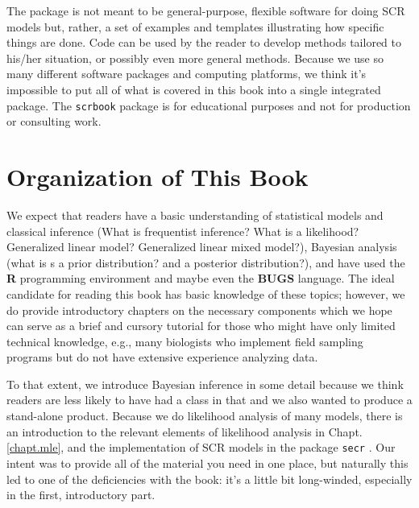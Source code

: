 The %
package is not meant to be general-purpose, %
flexible software for doing SCR models but, rather, a set of examples
and templates %
illustrating how specific things are done. Code can be used
by the reader to develop methods tailored to his/her situation, or
possibly even more general methods.  Because we use so many different
software packages and computing platforms, we think it's impossible to
put all of what is covered in this book into a single integrated
package.  The \mbox{\tt scrbook} package is for educational purposes
and not for production or consulting work.


\section*{Organization of This Book}

We expect that readers have a basic understanding of statistical
models and classical inference (What is frequentist inference? What is
a likelihood? Generalized linear model? Generalized linear mixed
model?), Bayesian analysis (what is s a prior distribution? and a
posterior distribution?), and have used the {\bf R} programming
environment and maybe even %
the \textbf{BUGS} language.  The ideal candidate for
reading this book has basic knowledge of these topics; however, we do
provide introductory chapters on the necessary components which we
hope can serve as a brief and cursory tutorial for those who might
have only limited technical knowledge, e.g., many biologists who
implement field sampling programs but do not have extensive experience
analyzing data.

To that extent, we introduce Bayesian inference in some detail because
we think readers are less likely to have had a class in that and we
also wanted to produce a stand-alone product.  Because we do
likelihood analysis of many models, there is an introduction to the
relevant elements of likelihood analysis in Chapt. \ref{chapt.mle},
and the implementation of SCR models in the package \mbox{\tt secr}
\citep{efford:2011}.  
Our intent was to provide all of the
material you need in one place, but naturally this led to one of the
deficiencies with the book: it's a little bit long-winded, especially in the first, introductory part.

